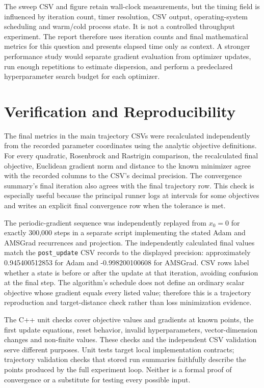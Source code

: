 ﻿\documentclass[conference]{IEEEtran}
\begin{document}
The sweep CSV and figure retain wall-clock measurements, but the timing field is influenced by iteration count, timer resolution, CSV output, operating-system scheduling and warm/cold process state. It is not a controlled throughput experiment. The report therefore uses iteration counts and final mathematical metrics for this question and presents elapsed time only as context. A stronger performance study would separate gradient evaluation from optimizer updates, run enough repetitions to estimate dispersion, and perform a predeclared hyperparameter search budget for each optimizer.
\section{Verification and Reproducibility}
The final metrics in the main trajectory CSVs were recalculated independently from the recorded parameter coordinates using the analytic objective definitions. For every quadratic, Rosenbrock and Rastrigin comparison, the recalculated final objective, Euclidean gradient norm and distance to the known minimizer agree with the recorded columns to the CSV's decimal precision. The convergence summary's final iteration also agrees with the final trajectory row. This check is especially useful because the principal runner logs at intervals for some objectives and writes an explicit final convergence row when the tolerance is met.

The periodic-gradient sequence was independently replayed from $x_0=0$ for exactly 300,000 steps in a separate script implementing the stated Adam and AMSGrad recurrences and projection. The independently calculated final values match the \texttt{post\_update} CSV records to the displayed precision: approximately 0.945400512853 for Adam and -0.998200100608 for AMSGrad. CSV rows label whether a state is before or after the update at that iteration, avoiding confusion at the final step. The algorithm's schedule does not define an ordinary scalar objective whose gradient equals every listed value; therefore this is a trajectory reproduction and target-distance check rather than loss minimization evidence.

The C++ unit checks cover objective values and gradients at known points, the first update equations, reset behavior, invalid hyperparameters, vector-dimension changes and non-finite values. These checks and the independent CSV validation serve different purposes. Unit tests target local implementation contracts; trajectory validation checks that stored run summaries faithfully describe the points produced by the full experiment loop. Neither is a formal proof of convergence or a substitute for testing every possible input.
\end{document}
